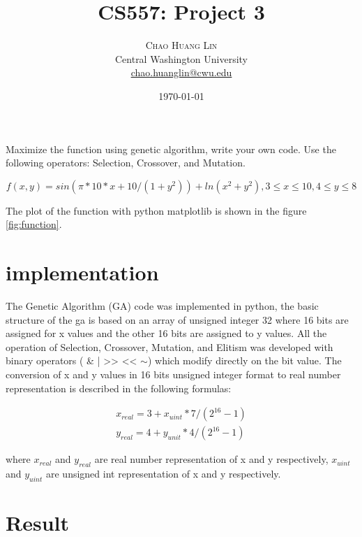 \documentclass[oneside,onecolumn]{article}
\title{CS557: Project 3} %
\author{%
\textsc{Chao Huang Lin} \\[1ex] %
\normalsize Central Washington University \\ %
\normalsize \href{mailto: chao.huanglin@cwu.edu}{chao.huanglin@cwu.edu} %
}
\date{\today} %
\begin{document}
\maketitle

Maximize the function using genetic algorithm, write your own code. Use the following operators: Selection, Crossover, and Mutation.



\begin{equation}
f(x,y) = sin(\pi*10*x+10/(1+y^2)) + ln(x^2+y^2), 3 \leq x \leq 10, 4 \leq y \leq 8
\end{equation}




The plot of the function with python matplotlib is shown in the figure \ref{fig:function}.


\section{implementation}

The Genetic Algorithm (GA) code was implemented in python, the basic structure of the ga is based on an array of unsigned integer 32 where 16 bits are assigned for x values and the other 16 bits are assigned to y values.
All the operation of Selection, Crossover, Mutation, and Elitism was developed with binary operators  ( \& | >> << \(\sim\))   which modify directly on the bit value.
The conversion of x and y values in 16 bits unsigned integer format to real number representation  is described in the following formulas:

\begin{equation}
\begin{split}
x_{real} = 3 + x_{uint} * 7/(2^{16} -1) \\
y_{real} = 4 + y_{unit} * 4/(2^{16} -1)
\end{split}
\end{equation}

where \( x_{real}\) and \(y_{real}\) are real number representation of x and y respectively, \( x_{uint}\) and \(y_{uint}\)   are unsigned int representation of x and y respectively.

\section{Result}
\end{document}
